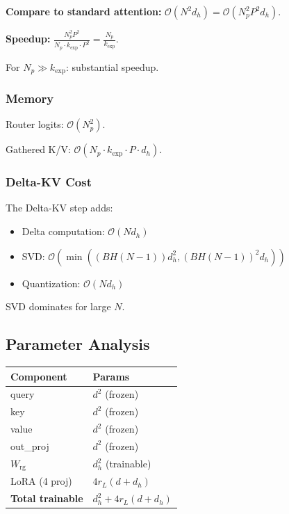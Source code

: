\textbf{Compare to standard attention:} $\mathcal{O}(N^2 d_h) = \mathcal{O}(N_p^2 P^2 d_h)$.

\textbf{Speedup:} $\frac{N_p^2 P^2}{N_p \cdot k_\text{exp} \cdot P^2} = \frac{N_p}{k_\text{exp}}$.

For $N_p \gg k_\text{exp}$: substantial speedup.

\subsubsection{Memory}

Router logits: $\mathcal{O}(N_p^2)$.

Gathered K/V: $\mathcal{O}(N_p \cdot k_\text{exp} \cdot P \cdot d_h)$.

\subsubsection{Delta-KV Cost}

The Delta-KV step adds:
\begin{itemize}
\item Delta computation: $\mathcal{O}(N d_h)$
\item SVD: $\mathcal{O}(\min((BH(N-1)) d_h^2, (BH(N-1))^2 d_h))$
\item Quantization: $\mathcal{O}(N d_h)$

\end{itemize}
SVD dominates for large $N$.

\subsection{Parameter Analysis}

\begin{table}[H]
\centering
\small
\begin{tabular}{ll}
\toprule
\textbf{Component} & \textbf{Params} \\
\midrule
query & $d^2$ (frozen) \\
key & $d^2$ (frozen) \\
value & $d^2$ (frozen) \\
out\_proj & $d^2$ (frozen) \\
$W_\text{rg}$ & $d_h^2$ (trainable) \\
LoRA (4 proj) & $4 r_L (d + d_h)$ \\
\textbf{Total trainable} & $d_h^2 + 4 r_L (d + d_h)$ \\
\bottomrule
\end{tabular}
\end{table}

